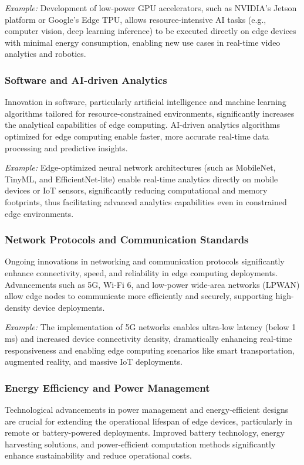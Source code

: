 \documentclass[runningheads]{llncs}
\begin{document}
\noindent\textit{Example:} Development of low-power GPU accelerators, such as NVIDIA's Jetson platform or Google's Edge TPU, allows resource-intensive AI tasks (e.g., computer vision, deep learning inference) to be executed directly on edge devices with minimal energy consumption, enabling new use cases in real-time video analytics and robotics.

\subsubsection{Software and AI-driven Analytics}
Innovation in software, particularly artificial intelligence and machine learning algorithms tailored for resource-constrained environments, significantly increases the analytical capabilities of edge computing. AI-driven analytics algorithms optimized for edge computing enable faster, more accurate real-time data processing and predictive insights.

\noindent\textit{Example:} Edge-optimized neural network architectures (such as MobileNet, TinyML, and EfficientNet-lite) enable real-time analytics directly on mobile devices or IoT sensors, significantly reducing computational and memory footprints, thus facilitating advanced analytics capabilities even in constrained edge environments.

\subsubsection{Network Protocols and Communication Standards}
Ongoing innovations in networking and communication protocols significantly enhance connectivity, speed, and reliability in edge computing deployments. Advancements such as 5G, Wi-Fi 6, and low-power wide-area networks (LPWAN) allow edge nodes to communicate more efficiently and securely, supporting high-density device deployments.

\noindent\textit{Example:} The implementation of 5G networks enables ultra-low latency (below 1 ms) and increased device connectivity density, dramatically enhancing real-time responsiveness and enabling edge computing scenarios like smart transportation, augmented reality, and massive IoT deployments.

\subsubsection{Energy Efficiency and Power Management}
Technological advancements in power management and energy-efficient designs are crucial for extending the operational lifespan of edge devices, particularly in remote or battery-powered deployments. Improved battery technology, energy harvesting solutions, and power-efficient computation methods significantly enhance sustainability and reduce operational costs.
\end{document}
